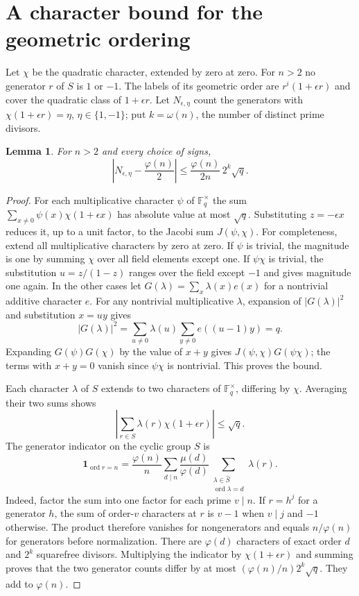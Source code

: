 \documentclass[11pt]{article}
\newtheorem{lemma}[theorem]{Lemma}
\newcommand{\F}{\mathbb F}
\newcommand{\ord}{\operatorname{ord}}
\begin{document}
\section{A character bound for the geometric ordering}

Let $\chi$ be the quadratic character, extended by zero at zero. For $n>2$ no generator $r$ of $S$ is $1$ or $-1$. The labels of its geometric order are $r^i(1+\epsilon r)$ and cover the quadratic class of $1+\epsilon r$. Let $N_{\epsilon,\eta}$ count the generators with $\chi(1+\epsilon r)=\eta$, $\eta\in\{1,-1\}$; put $k=\omega(n)$, the number of distinct prime divisors.

\begin{lemma}\label{character}
For $n>2$ and every choice of signs,
\[
 \left|N_{\epsilon,\eta}-\frac{\varphi(n)}2\right|
 \le \frac{\varphi(n)}{2n}\,2^k\sqrt q .
\]
\end{lemma}
\begin{proof}
For each multiplicative character $\psi$ of $\F_q^\times$ the sum $\sum_{x\ne0}\psi(x)\chi(1+\epsilon x)$ has absolute value at most $\sqrt q$. Substituting $z=-\epsilon x$ reduces it, up to a unit factor, to the Jacobi sum $J(\psi,\chi)$. For completeness, extend all multiplicative characters by zero at zero. If $\psi$ is trivial, the magnitude is one by summing $\chi$ over all field elements except one. If $\psi\chi$ is trivial, the substitution $u=z/(1-z)$ ranges over the field except $-1$ and gives magnitude one again. In the other cases let $G(\lambda)=\sum_x\lambda(x)e(x)$ for a nontrivial additive character $e$. For any nontrivial multiplicative $\lambda$, expansion of $|G(\lambda)|^2$ and substitution $x=uy$ gives
\[
 |G(\lambda)|^2=\sum_{u\ne0}\lambda(u)\sum_{y\ne0}e((u-1)y)=q .
\]
Expanding $G(\psi)G(\chi)$ by the value of $x+y$ gives $J(\psi,\chi)G(\psi\chi)$; the terms with $x+y=0$ vanish since $\psi\chi$ is nontrivial. This proves the bound.

Each character $\lambda$ of $S$ extends to two characters of $\F_q^\times$, differing by $\chi$. Averaging their two sums shows
\[
 \left|\sum_{r\in S}\lambda(r)\chi(1+\epsilon r)\right|\le\sqrt q .
\]
The generator indicator on the cyclic group $S$ is
\[
 \mathbf 1_{\ord r=n}
 =\frac{\varphi(n)}n\sum_{d\mid n}\frac{\mu(d)}{\varphi(d)}
              \sum_{\substack{\lambda\in\widehat S\\\ord\lambda=d}}\lambda(r).
\]
Indeed, factor the sum into one factor for each prime $v\mid n$. If $r=h^j$ for a generator $h$, the sum of order-$v$ characters at $r$ is $v-1$ when $v\mid j$ and $-1$ otherwise. The product therefore vanishes for nongenerators and equals $n/\varphi(n)$ for generators before normalization. There are $\varphi(d)$ characters of exact order $d$ and $2^k$ squarefree divisors. Multiplying the indicator by $\chi(1+\epsilon r)$ and summing proves that the two generator counts differ by at most $(\varphi(n)/n)2^k\sqrt q$. They add to $\varphi(n)$.
\end{proof}
\end{document}
